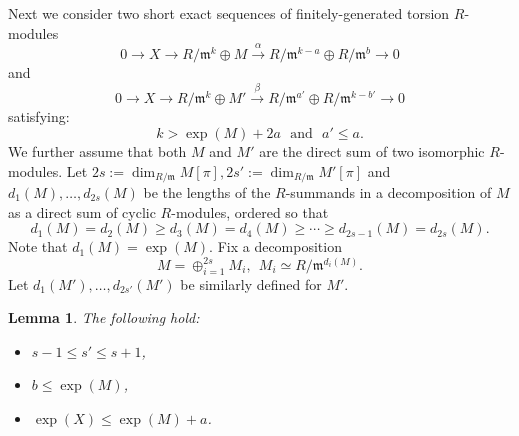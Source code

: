 \documentclass[10pt]{amsart}
\numberwithin{equation}{section}
\newtheorem{lemma}[theorem]{Lemma}
\theoremstyle{definition}
\theoremstyle{remark}
\newcommand{\fm}{\mathfrak{m}}
\begin{document}
Next we consider two short exact sequences of finitely-generated torsion $R$-modules
\begin{equation}\label{ses1}
0 \rightarrow X \rightarrow R/\fm^k \oplus M \xrightarrow{\alpha} R/\fm^{k-a} \oplus R/\fm^{b} \rightarrow 0
\end{equation}
and
\begin{equation}\label{ses2}
0 \rightarrow X \rightarrow R/\fm^k \oplus M'\xrightarrow{\beta} R/\fm^{a'} \oplus R/\fm^{k-b'} \rightarrow 0
\end{equation}
satisfying:
\begin{equation}\label{ses-hyp}
k>\exp(M)+2a \ \ \ \text{and} \ \ \ a'\leqslant a.
\end{equation}
We further assume that both $M$ and $M'$ are the direct sum of two isomorphic $R$-modules. Let $2s:= \dim_{R/\fm} M[\pi], 2s':= \dim_{R/\fm} M'[\pi]$ and $d_1(M),\dots,d_{2s}(M)$ be the lengths of the $R$-summands in a decomposition of $M$ as a direct sum of cyclic $R$-modules,
ordered so that
$$
d_1(M) = d_2(M) \geqslant d_3(M)=d_4(M) \geqslant \cdots \geqslant d_{2s-1}(M) = d_{2s}(M).
$$
Note that $d_1(M) = \exp(M)$.
Fix a decomposition 
$$
M = \oplus_{i=1}^{2s} M_i, \ \ M_i \simeq R/\fm^{d_i(M)}.
$$
Let $d_1(M'),\dots,d_{2s'}(M')$ be similarly defined for $M'$. 
\begin{lemma}\label{lem:key} The following hold:
\begin{itemize}
\item[(i)]  $s-1\leqslant s'\leqslant s+1$,
\item[(ii)] $b\leqslant \exp(M)$,
\item[(iii)] $\exp(X) \leqslant \exp(M)+a$.
\end{itemize}
\end{lemma}
\end{document}
